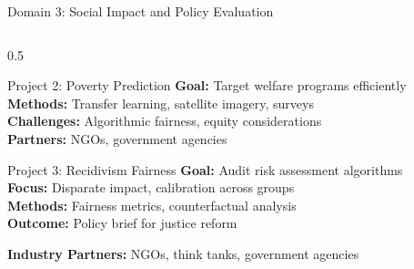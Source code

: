 \begin{frame}{Domain 3: Social Impact and Policy Evaluation}
\begin{columns}
\begin{column}{0.5\textwidth}
\vspace{0.2cm}

\begin{block}{Project 2: Poverty Prediction}
\textbf{Goal:} Target welfare programs efficiently\\
\textbf{Methods:} Transfer learning, satellite imagery, surveys\\
\textbf{Challenges:} Algorithmic fairness, equity considerations\\
\textbf{Partners:} NGOs, government agencies
\end{block}

\vspace{0.2cm}

\begin{block}{Project 3: Recidivism Fairness}
\textbf{Goal:} Audit risk assessment algorithms\\
\textbf{Focus:} Disparate impact, calibration across groups\\
\textbf{Methods:} Fairness metrics, counterfactual analysis\\
\textbf{Outcome:} Policy brief for justice reform
\end{block}

\vspace{0.2cm}

\textbf{Industry Partners:} NGOs, think tanks, government agencies
\end{column}
\end{columns}
\end{frame}


